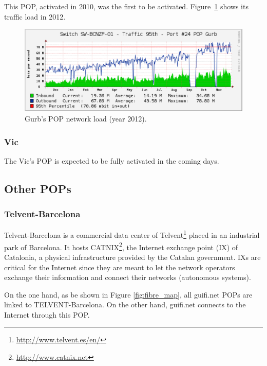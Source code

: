 This POP, activated in 2010, was the first to be activated. Figure~\ref{fig:gurb_net_load} shows its traffic load in 2012.


\begin{figure}[htbp]
  \centering
  \includegraphics[scale=.65]{sect3/figures/gurb_network_load_year.eps} 
  \caption{Gurb's POP network load (year 2012).}
  \label{fig:gurb_net_load}
\end{figure}



\FloatBarrier
\subsubsection{Vic}

The Vic's POP is expected to be fully activated in the coming days.


\FloatBarrier
\subsection{Other POPs}


\FloatBarrier
\subsubsection{Telvent-Barcelona}

Telvent-Barcelona is a commercial data center of Telvent\footnote{\url{http://www.telvent.es/en/}} placed in an industrial park of Barcelona. It hosts CATNIX\footnote{\url{http://www.catnix.net}}, the Internet exchange point (IX) of Catalonia, a physical infrastructure provided by the Catalan government. IXs are critical for the Internet since they are meant to let the network operators exchange their information and connect their networks (autonomous systems). 

On the one hand, as be shown in Figure \ref{fig:fibre_map}, all guifi.net POPs are linked to TELVENT-Barcelona. On the other hand, guifi.net connects to the Internet through this POP.


